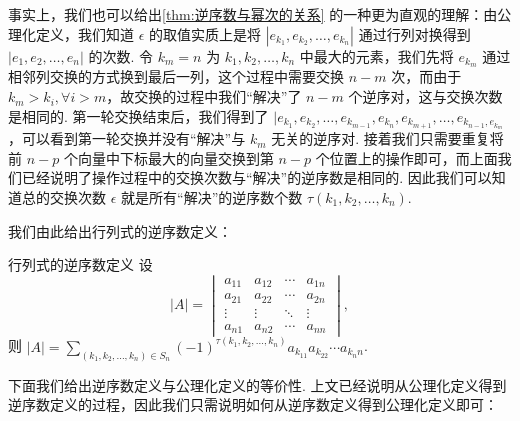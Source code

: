 事实上，我们也可以给出\autoref{thm:逆序数与幂次的关系} 的一种更为直观的理解：由公理化定义，我们知道 $\epsilon$ 的取值实质上是将 $|e_{k_1}, e_{k_2}, \ldots, e_{k_n}|$ 通过行列对换得到 $|e_1, e_2, \ldots, e_n|$ 的次数. 令 $k_m = n$ 为 $k_1, k_2, \ldots, k_n$ 中最大的元素，我们先将 $e_{k_m}$ 通过相邻列交换的方式换到最后一列，这个过程中需要交换 $n - m$ 次，而由于 $k_m > k_i, \forall i > m$，故交换的过程中我们``解决''了 $n - m$ 个逆序对，这与交换次数是相同的. 第一轮交换结束后，我们得到了 $|e_{k_1}, e_{k_2}, \ldots, e_{k_{m-1}}, e_{k_n}, e_{k_{m+1}}, \ldots, e_{k_{n-1}, e_{k_m}}$，可以看到第一轮交换并没有``解决''与 $k_m$ 无关的逆序对. 接着我们只需要重复将前 $n-p$ 个向量中下标最大的向量交换到第 $n-p$ 个位置上的操作即可，而上面我们已经说明了操作过程中的交换次数与``解决''的逆序数是相同的. 因此我们可以知道总的交换次数 $\epsilon$ 就是所有``解决''的逆序数个数 $\tau(k_1,k_2,\ldots,k_n)$.

我们由此给出行列式的逆序数定义：

\begin{theorem}{行列式的逆序数定义}{}
    设
    \[|A| = \begin{vmatrix}
            a_{11} & a_{12} & \cdots & a_{1n} \\
            a_{21} & a_{22} & \cdots & a_{2n} \\
            \vdots & \vdots & \ddots & \vdots \\
            a_{n1} & a_{n2} & \cdots & a_{nn}
        \end{vmatrix},\]
    则 $|A| = \sum\limits_{(k_1,k_2,\ldots,k_n) \in S_n} (-1)^{\tau(k_1,k_2,\ldots,k_n)}a_{k_11}a_{k_22}\cdots a_{k_nn}$.
\end{theorem}

下面我们给出逆序数定义与公理化定义的等价性. 上文已经说明从公理化定义得到逆序数定义的过程，因此我们只需说明如何从逆序数定义得到公理化定义即可：

